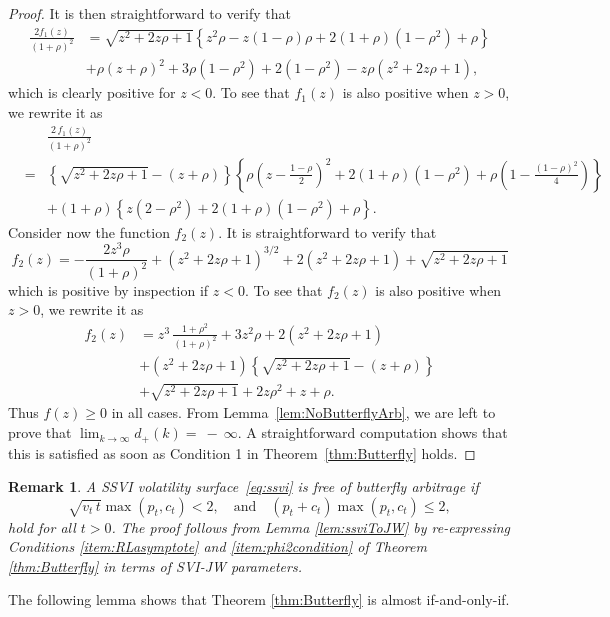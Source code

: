 \documentclass[12pt]{article}
\newtheorem{remark}{Remark}[section]
\numberwithin{equation}{section}
\newcommand{\beas}{\begin{eqnarray*}}
\newcommand{\eeas}{\end{eqnarray*}}
\begin{document}
\begin{proof}
It is then straightforward to verify that
\begin{align*}
\frac{2f_1(z)}{(1+\rho)^2} &
 = \sqrt{z^2+2 z \rho +1} \left\{z^2 \rho -z (1-\rho ) \rho +2 (1+\rho) \left(1-\rho ^2\right)+\rho \right\}\\
 & +\rho \left(z+\rho\right)^2+3 \rho  \left(1-\rho ^2\right)+2 \left(1-\rho ^2\right)-z \rho\left(z^2+2z\rho+1\right),
\end{align*}
which is clearly positive for $z<0$.
To see that $f_1(z)$ is also positive when $z>0$, we rewrite it as
\beas
&&\frac{2\,f_1(z)}{(1+\rho)^2}\\
&=&\left\{\sqrt{z^2+2 z \rho +1}-(z+\rho) \right\} \left\{\rho  \left(z-\frac{1-\rho }{2}\right)^2+2 (1+\rho) \left(1-\rho^2\right)+\rho \left(1-\frac{(1-\rho )^2}{4}\right)\right\}\\
   && + (1+\rho) \left\{z \left(2-\rho^2\right)+2\left(1+\rho\right)\left(1-\rho^2\right)+\rho\right\}.
\eeas
Consider now the function $f_2(z)$.  It is straightforward to verify that
$$
f_2(z)=-\frac{2 z^3 \rho }{(1+\rho)^2}+\left(z^2+2 z \rho +1\right)^{3/2}
+2\left(z^2+2z\rho+1\right)+\sqrt{z^2+2z\rho+1}
$$
which is positive by inspection if $z<0$.  To see that $f_2(z)$ is also positive when $z>0$, we rewrite it as
\begin{align*}
f_2(z) & = z^3\,\frac{ 1+\rho ^2}{(1+\rho)^2}+3 z^2 \rho +2 \left(z^2+2 z \rho +1\right)\\
& +\left(z^2+2 z \rho +1\right)\left\{\sqrt{z^2+2 z \rho +1}-(z+\rho) \right\}\\
& +\sqrt{z^2+2 z \rho +1}+2 z \rho ^2+z+\rho.
\end{align*}
Thus $f(z) \geq 0$ in all cases.
From Lemma~\ref{lem:NoButterflyArb}, we are left to prove that $\lim_{k\to\infty}d_+(k)=~-~\infty$.
A straightforward computation shows that this is satisfied as soon as Condition 1 in Theorem~\ref{thm:Butterfly} holds.
\end{proof}

\begin{remark}
A SSVI volatility surface~\eqref{eq:ssvi} is free of butterfly arbitrage if
$$
\sqrt{v_t\,t}\max\left(p_t,c_t\right) < 2,
\quad\text{and}\quad
(p_t+c_t)\max\left(p_t,c_t\right)\leq 2,
$$
hold for all $t>0$.  The proof follows from Lemma \ref{lem:ssviToJW} by re-expressing Conditions \ref{item:RLasymptote} and \ref{item:phi2condition} of Theorem \ref{thm:Butterfly} in terms of SVI-JW parameters.
\end{remark}

The following lemma shows that Theorem \ref{thm:Butterfly} is almost if-and-only-if.
\end{document}
